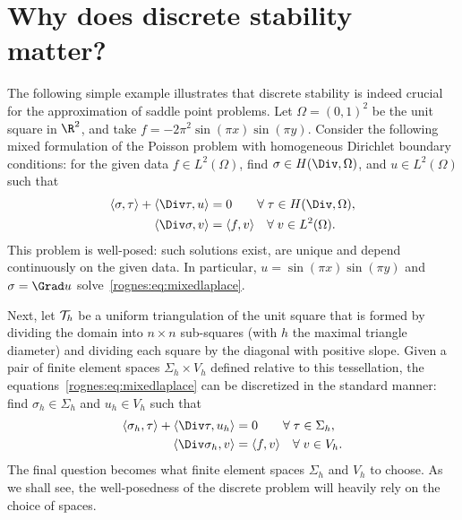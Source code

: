 \section{Why does discrete stability matter?}
\label{rognes:sec:motivation}

The following simple example illustrates that discrete stability is
indeed crucial for the approximation of saddle point problems. Let
$\Omega = (0, 1)^2$ be the unit square in $\R^2$, and take $f = - 2
\pi^2 \sin(\pi x) \sin(\pi y)$. Consider the following mixed
formulation of the Poisson problem with homogeneous Dirichlet boundary
conditions: for the given data $f \in L^2(\Omega)$, find $\sigma \in
H(\Div, \Omega)$, and $u \in L^2(\Omega)$ such that
\begin{equation}
  \label{rognes:eq:mixedlaplace}
  \begin{split}
    \langle \sigma, \tau \rangle + \langle \Div \tau, u \rangle &= 0
    \quad\quad \rognesforalls \tau \in H(\Div, \Omega), \\
    \langle \Div \sigma, v \rangle &= \langle f, v \rangle
    \quad \rognesforalls v \in L^2(\Omega).
  \end{split}
\end{equation}
This problem is well-posed: such solutions exist, are unique and
depend continuously on the given data. In particular, $u = \sin(\pi x)
\sin(\pi y)$ and $\sigma = \Grad u$
solve~\eqref{rognes:eq:mixedlaplace}.

Next, let $\mathcal{T}_h$ be a uniform triangulation of the unit
square that is formed by dividing the domain into $n \times n$
sub-squares (with $h$ the maximal triangle diameter) and dividing each
square by the diagonal with positive slope. Given a pair of finite
element spaces $\Sigma_h \times V_h$ defined relative to this
tessellation, the equations~\eqref{rognes:eq:mixedlaplace} can be
discretized in the standard manner: find $\sigma_h \in \Sigma_h$ and
$u_h \in V_h$ such that
\begin{equation}
  \label{rognes:eq:mixedlaplace:discrete}
  \begin{split}
    \langle \sigma_h, \tau \rangle + \langle \Div \tau, u_h \rangle &= 0
    \quad\quad \rognesforalls \tau \in \Sigma_h, \\
    \langle \Div \sigma_h, v \rangle &= \langle f, v \rangle
    \quad \rognesforalls v \in V_h.
  \end{split}
\end{equation}
The final question becomes what finite element spaces $\Sigma_h$ and
$V_h$ to choose. As we shall see, the well-posedness of the discrete
problem will heavily rely on the choice of spaces.

